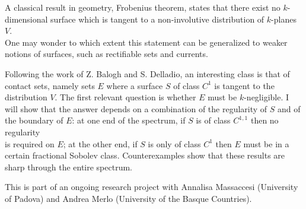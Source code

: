 \mypage
{}
\begin{myabstract}
A classical result in geometry, Frobenius theorem, states that there exist no \protect $k$-dimensional surface which is tangent to a non-involutive distribution of \protect $k$-planes \protect $V$.\\\relax
One may wonder to which extent this statement can be generalized to weaker notions of surfaces, such as rectifiable sets and currents.

Following the work of Z. Balogh and S. Delladio, an interesting class is that of contact sets, namely sets \protect $E$ where a surface \protect $S$ of class \protect $C^1$ is tangent to the distribution \protect $V$. The first relevant question is whether \protect $E$ must be \protect $k$-negligible. I will show that the answer depends on a combination of the regularity of \protect $S$ and of the boundary of \protect $E$: at one end of the spectrum, if \protect $S$ is of class \protect $C^{1,1}$ then no regularity\\\relax
is required on \protect $E$; at the other end, if \protect $S$ is only of class \protect $C^1$ then \protect $E$ must be in a certain fractional Sobolev class. Counterexamples show that these results are sharp through the entire spectrum.

This is part of an ongoing research project with Annalisa Massaccesi (University of Padova) and Andrea Merlo (University of the Basque Countries).
\end{myabstract}
